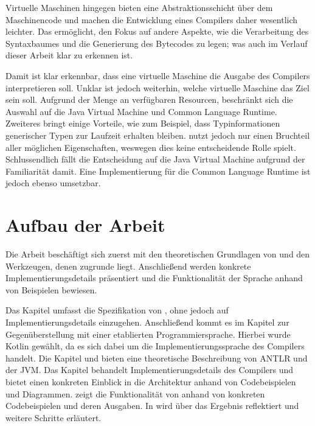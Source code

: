 Virtuelle Maschinen hingegen bieten eine Abstraktionsschicht über dem Maschinencode und machen die Entwicklung eines Compilers daher wesentlich leichter. Das ermöglicht, den Fokus auf andere Aspekte, wie die Verarbeitung des Syntaxbaumes und die Generierung des Bytecodes zu legen; was auch im Verlauf dieser Arbeit klar zu erkennen ist.

Damit ist klar erkennbar, dass eine virtuelle Maschine die Ausgabe des Compilers interpretieren soll. Unklar ist jedoch weiterhin, welche virtuelle Maschine das Ziel sein soll. Aufgrund der Menge an verfügbaren Resourcen, beschränkt sich die Auswahl auf die Java Virtual Machine und Common Language Runtime. Zweiteres bringt einige Vorteile, wie zum Beispiel, dass Typinformationen generischer Typen zur Laufzeit erhalten bleiben. \Toya nutzt jedoch nur einen Bruchteil aller möglichen Eigenschaften, weswegen dies keine entscheidende Rolle spielt. Schlussendlich fällt die Entscheidung auf die Java Virtual Machine aufgrund der Familiarität damit. Eine Implementierung für die Common Language Runtime ist jedoch ebenso umsetzbar.

\section{Aufbau der Arbeit}

Die Arbeit beschäftigt sich zuerst mit den theoretischen Grundlagen von \toya und den Werkzeugen, denen \toya zugrunde liegt. Anschließend werden konkrete Implementierungsdetails präsentiert und die Funktionalität der Sprache anhand von Beispielen bewiesen.

Das Kapitel  umfasst die Spezifikation von \toya, ohne jedoch auf Implementierungsdetails einzugehen. Anschließend kommt es im Kapitel  zur Gegenüberstellung mit einer etablierten Programmiersprache. Hierbei wurde Kotlin gewählt, da es sich dabei um die Implementierungssprache des \toya Compilers handelt. Die Kapitel  und  bieten eine theoretische Beschreibung von ANTLR und der JVM. Das Kapitel  behandelt Implementierungsdetails des Compilers und bietet einen konkreten Einblick in die Architektur anhand von Codebeispielen und Diagrammen.  zeigt die Funktionalität von \toya anhand von konkreten Codebeispielen und deren Ausgaben. In  wird über das Ergebnis reflektiert und weitere Schritte erläutert.